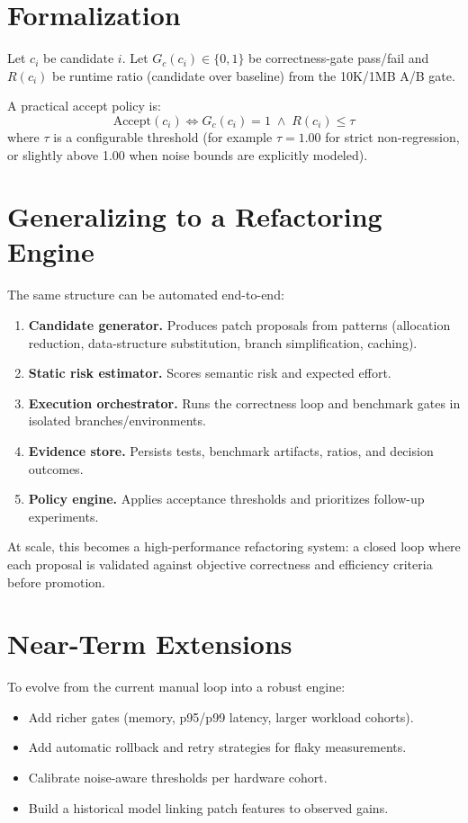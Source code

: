 \documentclass[11pt]{article}
\begin{document}
\section{Formalization}
Let \(c_i\) be candidate \(i\). Let \(G_c(c_i)\in\{0,1\}\) be correctness-gate pass/fail and \(R(c_i)\) be runtime ratio (candidate over baseline) from the 10K/1MB A/B gate.

A practical accept policy is:
\[
\text{Accept}(c_i) \iff G_c(c_i)=1 \;\wedge\; R(c_i)\le \tau
\]
where \(\tau\) is a configurable threshold (for example \(\tau=1.00\) for strict non-regression, or slightly above 1.00 when noise bounds are explicitly modeled).

\section{Generalizing to a Refactoring Engine}
The same structure can be automated end-to-end:
\begin{enumerate}
  \item \textbf{Candidate generator.} Produces patch proposals from patterns (allocation reduction, data-structure substitution, branch simplification, caching).
  \item \textbf{Static risk estimator.} Scores semantic risk and expected effort.
  \item \textbf{Execution orchestrator.} Runs the correctness loop and benchmark gates in isolated branches/environments.
  \item \textbf{Evidence store.} Persists tests, benchmark artifacts, ratios, and decision outcomes.
  \item \textbf{Policy engine.} Applies acceptance thresholds and prioritizes follow-up experiments.
\end{enumerate}

At scale, this becomes a high-performance refactoring system: a closed loop where each proposal is validated against objective correctness and efficiency criteria before promotion.

\section{Near-Term Extensions}
To evolve from the current manual loop into a robust engine:
\begin{itemize}
  \item Add richer gates (memory, p95/p99 latency, larger workload cohorts).
  \item Add automatic rollback and retry strategies for flaky measurements.
  \item Calibrate noise-aware thresholds per hardware cohort.
  \item Build a historical model linking patch features to observed gains.
\end{itemize}
\end{document}
